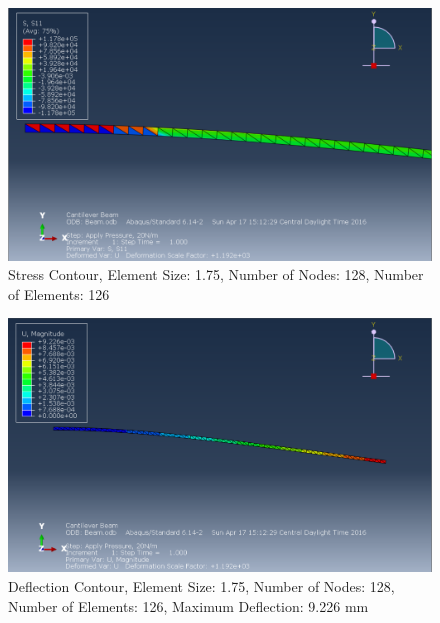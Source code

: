 \documentclass[a4paper]{article}
\begin{document}
\begin{figure}[ht]
\centering
\includegraphics[scale=.50]{3Nsize1_75Stress.PNG}
\caption{Stress Contour, Element Size: 1.75, Number of Nodes: 128, Number of Elements: 126}
\end{figure}
\begin{figure}[ht]
\centering
\includegraphics[scale=.50]{3Nsize1_75MDisplacement.PNG}
\caption{Deflection Contour, Element Size: 1.75, Number of Nodes: 128, Number of Elements: 126, Maximum Deflection: 9.226 mm}
\end{figure}
\end{document}
